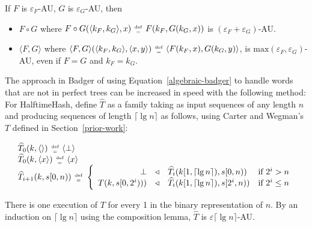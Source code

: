 \documentclass{llncs}
\newcommand{\defeq}{\;\genfrac{}{}{0pt}{2}{\text{def}}{=}\;}
\begin{document}
\begin{lemma}
  If $F$ is $\varepsilon_F$-AU, $G$ is $\varepsilon_G$-AU, then
  \begin{itemize}
  \item $F \circ G$ where $F \circ G (\langle k_F, k_G \rangle, x) \defeq F(k_F,G(k_G, x))$ is $(\varepsilon_F + \varepsilon_G)$-AU.
  \item $\langle F, G\rangle$ where $\langle F, G \rangle(\langle k_F, k_G \rangle, \langle x, y \rangle) \defeq \langle F(k_F,x), G(k_G,y) \rangle$, is $\text{max}(\varepsilon_F, \varepsilon_G)$-AU, even if $F=G$ and $k_F = k_G$.
  \end{itemize}
\end{lemma}

The approach in Badger of using Equation~\ref{algebraic-badger} to handle words that are not in perfect trees can be increased in speed with the following method:
For HalftimeHash, define $\widehat{T}$ as a family taking as input sequences of any length $n$ and producing sequences of length $\lceil \lg n \rceil$ as follows, using Carter and Wegman's $T$ defined in Section~\ref{prior-work}:

\begin{equation}
\label{stack-construction}
\begin{array}{l}
\widehat{T}_0(k, \langle \rangle) \defeq \langle \bot \rangle \\
\widehat{T}_0(k, \langle x \rangle) \defeq \langle x \rangle \\
\widehat{T}_{i+1}(k, s[0,n)) \defeq \left\{
  \begin{array}{rcll}
   \bot &\triangleleft& \widehat{T}_i(k[1,\lceil\lg n\rceil), s[0,n)) & \text{if } 2^i > n \\
    T(k, s[0, 2^i))) &\triangleleft& \widehat{T}_{i}(k[1,\lceil\lg n\rceil),s[2^i, n)) & \text{if } 2^i \le n
  \end{array}
  \right.
\end{array}
\end{equation}

There is one execution of $T$ for every 1 in the binary representation of $n$.
By an induction on $\lceil \lg n \rceil$ using the composition lemma, $\widehat{T}$ is $\varepsilon \lceil \lg n \rceil$-AU.
\end{document}
